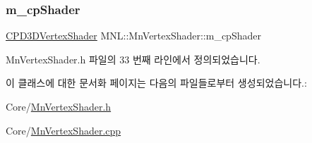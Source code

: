 \subsubsection{\texorpdfstring{m\+\_\+cp\+Shader}{m\_cpShader}}
{\footnotesize\ttfamily \hyperlink{namespace_m_n_l_a8036d713226061c4827b537821fbf79b}{C\+P\+D3\+D\+Vertex\+Shader} M\+N\+L\+::\+Mn\+Vertex\+Shader\+::m\+\_\+cp\+Shader\hspace{0.3cm}{\ttfamily [private]}}



Mn\+Vertex\+Shader.\+h 파일의 33 번째 라인에서 정의되었습니다.



이 클래스에 대한 문서화 페이지는 다음의 파일들로부터 생성되었습니다.\+:\begin{DoxyCompactItemize}
\item 
Core/\hyperlink{_mn_vertex_shader_8h}{Mn\+Vertex\+Shader.\+h}\item 
Core/\hyperlink{_mn_vertex_shader_8cpp}{Mn\+Vertex\+Shader.\+cpp}\end{DoxyCompactItemize}
